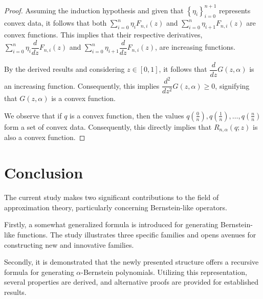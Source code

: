 \documentclass[preprint,12pt]{elsarticle}
\theoremstyle{definition}
\theoremstyle{theorem}
\theoremstyle{lemma}
\theoremstyle{example}
\theoremstyle{remark}
\theoremstyle{prop}
\begin{document}
\begin{proof}
Assuming the induction hypothesis and given that $\left \{ \eta_{i} \right \}_{i=0}^{n+1}$ represents convex data, it follows that both $ \sum_{i=0}^{n}\eta_{i}F_{n,i}(z) $ and $ \sum_{i=0}^{n}\eta_{i+1}F_{n,i}(z) $ are convex functions. This implies that their respective derivatives, $ \sum_{i=0}^{n}\eta_{i} \dfrac{d}{dz} F_{n,i}(z)$ and $\sum_{i=0}^{n}\eta_{i+1} \dfrac{d}{dz} F_{n,i}(z) $, are increasing functions.


By the derived results and considering $ z \in [0,1] $, it follows that $ \dfrac{d}{dz} G(z,\alpha) $ is an increasing function. Consequently, this implies $ \dfrac{d^2}{dz^2} G(z,\alpha) \geq 0 $, signifying that $ G(z,\alpha) $ is a convex function.


We observe that if $ q $ is a convex function, then the values $ q\left(\frac{0}{n}\right), q\left(\frac{1}{n}\right), \ldots, q\left(\frac{n}{n}\right) $ form a set of convex data. Consequently, this directly implies that $ R_{n,\alpha}(q;z) $ is also a convex function.
\end{proof}



\section{Conclusion}

The current study makes two significant contributions to the field of approximation theory, particularly concerning Bernstein-like operators.

Firstly, a somewhat generalized formula is introduced for generating Bernstein-like functions. The study illustrates three specific families and opens avenues for constructing new and innovative families.

Secondly, it is demonstrated that the newly presented structure offers a recursive formula for generating $\alpha$-Bernstein polynomials. Utilizing this  representation, several properties are derived, and alternative proofs are provided for established results.




\end{document}
